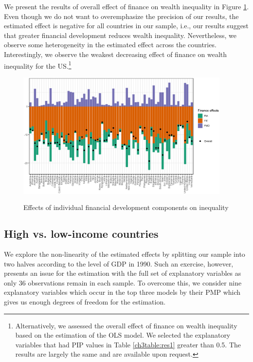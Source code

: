 \begin{refsection}
We present the results of overall effect of finance on wealth inequality in Figure \ref{ch3fig:finance_effect}. Even though we do not want to overemphasize the precision of our results, the estimated effect is negative for all countries in our sample, i.e., our results suggest that greater financial development reduces wealth inequality. Nevertheless, we observe some heterogeneity in the estimated effect across the countries. Interestingly, we observe the weakest decreasing effect of finance on wealth inequality for the US.\footnote{Alternatively, we assessed the overall effect of finance on wealth inequality based on the estimation of the \ac{OLS} model. We selected the explanatory variables that had \ac{PIP} values in Table \ref{ch3table:res1} greater than 0.5. The results are largely the same and are available upon request.}

\begin{figure}
\begin{center}
\caption{Effects of individual financial development components on inequality}
\includegraphics[width=0.95\textwidth]{figures/ch3/finance_effect.eps}
\label{ch3fig:finance_effect}
\end{center}
\end{figure}

\subsection{High vs. low-income countries}
We explore the non-linearity of the estimated effects by splitting our sample into two halves according to the level of GDP in 1990. Such an exercise, however, presents an issue for the estimation with the full set of explanatory variables as only 36 observations remain in each sample. To overcome this, we consider nine explanatory variables which occur in the top three models by their \ac{PMP} which gives us enough degrees of freedom for the estimation. 


\end{refsection}
